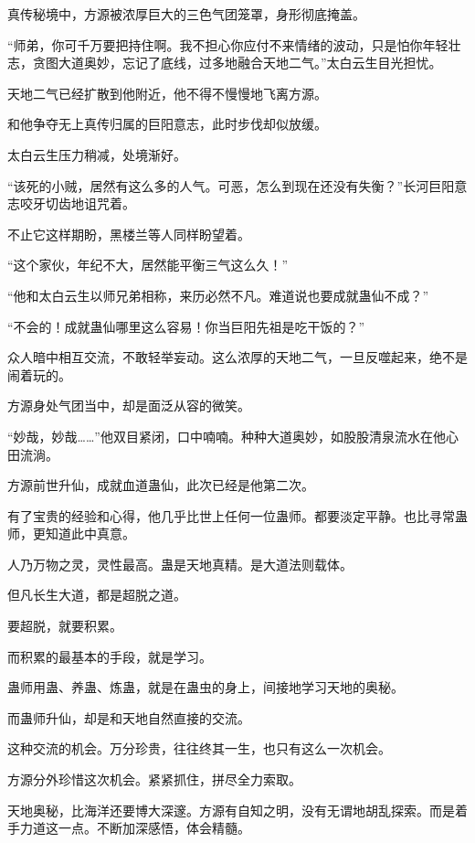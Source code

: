 
\begin{this_body}



真传秘境中，方源被浓厚巨大的三色气团笼罩，身形彻底掩盖。

“师弟，你可千万要把持住啊。我不担心你应付不来情绪的波动，只是怕你年轻壮志，贪图大道奥妙，忘记了底线，过多地融合天地二气。”太白云生目光担忧。

天地二气已经扩散到他附近，他不得不慢慢地飞离方源。

和他争夺无上真传归属的巨阳意志，此时步伐却似放缓。

太白云生压力稍减，处境渐好。

“该死的小贼，居然有这么多的人气。可恶，怎么到现在还没有失衡？”长河巨阳意志咬牙切齿地诅咒着。

不止它这样期盼，黑楼兰等人同样盼望着。

“这个家伙，年纪不大，居然能平衡三气这么久！”

“他和太白云生以师兄弟相称，来历必然不凡。难道说也要成就蛊仙不成？”

“不会的！成就蛊仙哪里这么容易！你当巨阳先祖是吃干饭的？”

众人暗中相互交流，不敢轻举妄动。这么浓厚的天地二气，一旦反噬起来，绝不是闹着玩的。

方源身处气团当中，却是面泛从容的微笑。

“妙哉，妙哉……”他双目紧闭，口中喃喃。种种大道奥妙，如股股清泉流水在他心田流淌。

方源前世升仙，成就血道蛊仙，此次已经是他第二次。

有了宝贵的经验和心得，他几乎比世上任何一位蛊师。都要淡定平静。也比寻常蛊师，更知道此中真意。

人乃万物之灵，灵性最高。蛊是天地真精。是大道法则载体。

但凡长生大道，都是超脱之道。

要超脱，就要积累。

而积累的最基本的手段，就是学习。

蛊师用蛊、养蛊、炼蛊，就是在蛊虫的身上，间接地学习天地的奥秘。

而蛊师升仙，却是和天地自然直接的交流。

这种交流的机会。万分珍贵，往往终其一生，也只有这么一次机会。

方源分外珍惜这次机会。紧紧抓住，拼尽全力索取。

天地奥秘，比海洋还要博大深邃。方源有自知之明，没有无谓地胡乱探索。而是着手力道这一点。不断加深感悟，体会精髓。


\end{this_body}
